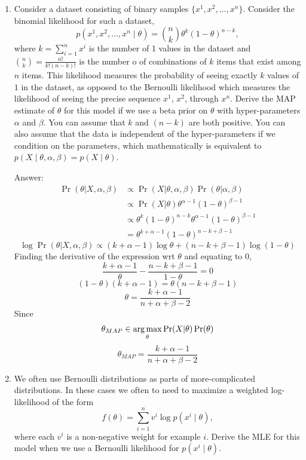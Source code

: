 \documentclass{article}
\def\ans#1{\par\gre{Answer: #1}}
\def\blu#1{{\color{blu}#1}}
\def\gre#1{{\color{gre}#1}}
\def\argmax{\mathop{\rm arg\,max}}
\def\cond{\; | \;}
\def\enum#1{\begin{enumerate}#1\end{enumerate}}
\begin{document}
\enum{
\item Consider a dataset consisting of binary samples $\{x^1,x^2,\dots,x^n\}$. Consider the binomial likelihood for such a dataset,
\[
p(x^1, x^2,\dots, x^n \cond \theta) = {n \choose k}\theta^k(1-\theta)^{n - k},
\]
where $k = \sum_{i=1}^nx^i$ is the number of 1 values in the dataset and${n \choose k} = \frac{n!}{k!(n-k)!}$ is the number o of combinations of $k$ items that exist among $n$ items. This likelihood measures the probability of seeing exactly $k$ values of $1$ in the dataset, as opposed to the Bernoulli likelihood which measures the likelihood of seeing the precise sequence $x^1$, $x^2$, through $x^n$.
\blu{Derive the MAP estimate of $\theta$ for this model if we use a beta prior on $\theta$ with hyper-parameters $\alpha$ and $\beta$.} You can assume that $k$ and $(n-k)$ are both positive. You can also assume that the data is independent of the hyper-parameters if we condition on the parameters, which mathematically is equivalent to $p(X \cond \theta, \alpha, \beta) = p(X \cond \theta)$.
\ans{
\begin{equation}
\begin{aligned}
    \Pr(\theta | X,\alpha,\beta) 
    & \propto \Pr(X | \theta,\alpha,\beta) \Pr(\theta|\alpha,\beta)\\
    & \propto \Pr(X | \theta) \theta^{\alpha-1}(1-\theta)^{\beta-1}\\
    & \propto \theta^k(1-\theta)^{n - k}
    \theta^{\alpha-1}(1-\theta)^{\beta-1}\\
    &= \theta^{k+\alpha-1}(1-\theta)^{n-k+\beta-1}
\end{aligned}
\end{equation}
\[\log\Pr(\theta | X,\alpha,\beta) \propto
(k+\alpha-1)\log\theta + (n-k+\beta-1)\log(1-\theta)
\]
Finding the derivative of the expression wrt $\theta$ and equating to 0,
\[\frac{k+\alpha-1}{\theta}-\frac{n-k+\beta-1}{1-\theta}=0\]
\[(1-\theta)(k+\alpha-1)=\theta(n-k+\beta-1)\]
\[\theta = \frac{k+\alpha-1}{n+\alpha+\beta-2}\]
Since
\[\theta_{MAP} \in \argmax_{\theta}{\Pr(X | \theta) \Pr(\theta)}\]
\[\theta_{MAP} = \frac{k+\alpha-1}{n+\alpha+\beta-2}\]
}
\pagebreak
\item We often use Bernoulli distributions as parts of more-complicated distributions. In these cases we often to need to maximize a weighted log-likelihood of the form
\[
f(\theta) = \sum_{i=1}^n v^i \log p(x^i \cond \theta),
\]
where each $v^i$ is a non-negative weight for example $i$. \blu{Derive the MLE for this model when we use a Bernoulli likelihood for $p(x^i \cond \theta)$.}
}
\end{document}
